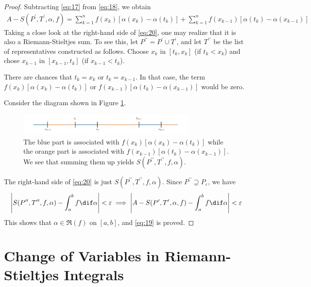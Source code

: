 \documentclass[thmcnt=section, color=blue, 12pt]{my-elegantbook}
\begin{document}
\begin{proof}
	Subtracting \eqref{eq:17} from \eqref{eq:18}, we obtain
	\begin{align}
		A - S(P^\prime, T^\prime, \alpha, f)
		= \sum_{k=1}^n f(x_k) [ \alpha(x_k) - \alpha(t_k) ]
		+ \sum_{k=1}^n f(x_{k-1}) [ \alpha(t_k) - \alpha(x_{k-1}) ]
		\label{eq:20}
	\end{align}
	Taking a close look at the right-hand side of \eqref{eq:20},
	one may realize that it is also a Riemann-Stieltjes sum.
	To see this, let $P^{\prime\prime} = P^\prime \cup T^\prime$,
	and let $T^{\prime\prime}$ be the list of representatives constructed as follows.
	Choose $x_k$ in $[t_k, x_k]$ (if $t_k < x_k$)
	and chose $x_{k-1}$ in $[x_{k-1}, t_k]$ (if $x_{k-1} < t_k$).
	\begin{note}
		There are chances that $t_k = x_k$ or $t_k = x_{k-1}$.
		In that case, the term $f(x_k)[\alpha(x_k)-\alpha(t_k)]$
		or $f(x_{k-1})[\alpha(t_k)-\alpha(x_{k-1})]$
		would be zero.
	\end{note}

	Consider the diagram shown in Figure \ref{fig:5}.
	\begin{figure}[H]
		\centering
		\includegraphics[width=0.8\textwidth]{figures/integration-by-parts-proof-diagram.png}
		\caption{The blue part is associated with $f(x_k)[\alpha(x_k)-\alpha(t_k)]$ while the orange part is associated with $f(x_{k-1})[\alpha(t_k)-\alpha(x_{k-1})]$. We see that summing them up yields $S(P^{\prime\prime}, T^{\prime\prime}, f, \alpha)$.}
		\label{fig:5}
	\end{figure}

	The right-hand side of \eqref{eq:20}
	is just $S(P^{\prime\prime}, T^{\prime\prime}, f, \alpha)$.
	Since $P^{\prime\prime} \supseteq P_\varepsilon$,
	we have
	\begin{align*}
		\abs{
			S(P^{\prime\prime}, T^{\prime\prime}, f, \alpha)
			- \int_a^b f \dif \alpha
		} < \varepsilon
		\implies \abs{
			A - S(P^\prime, T^\prime, \alpha, f) -  \int_a^b f \dif \alpha
		} < \varepsilon
	\end{align*}
	This shows that $\alpha \in \mathfrak{R}(f)$ on $[a, b]$,
	and \eqref{eq:19} is proved.
\end{proof}

\section{Change of Variables in Riemann-Stieltjes Integrals}
\end{document}
